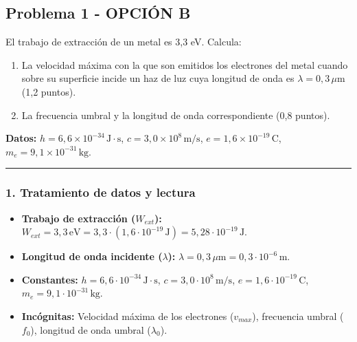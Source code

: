 \newpage

\subsection{Problema 1 - OPCIÓN B}
\label{subsec:5B_2007_jun_ord}

\begin{cajaenunciado}
El trabajo de extracción de un metal es 3,3 eV. Calcula:
\begin{enumerate}
    \item La velocidad máxima con la que son emitidos los electrones del metal cuando sobre su superficie incide un haz de luz cuya longitud de onda es $\lambda=0,3\,\mu\text{m}$ (1,2 puntos).
    \item La frecuencia umbral y la longitud de onda correspondiente (0,8 puntos).
\end{enumerate}
\textbf{Datos:} $h=6,6\times10^{-34}\,\text{J}\cdot\text{s}$, $c=3,0\times10^8\,\text{m/s}$, $e=1,6\times10^{-19}\,\text{C}$, $m_e=9,1\times10^{-31}\,\text{kg}$.
\end{cajaenunciado}
\hrule

\subsubsection*{1. Tratamiento de datos y lectura}
\begin{itemize}
    \item \textbf{Trabajo de extracción ($W_{ext}$):} $W_{ext} = 3,3\,\text{eV} = 3,3 \cdot (1,6\cdot10^{-19}\,\text{J}) = 5,28\cdot10^{-19}\,\text{J}$.
    \item \textbf{Longitud de onda incidente ($\lambda$):} $\lambda = 0,3\,\mu\text{m} = 0,3 \cdot 10^{-6}\,\text{m}$.
    \item \textbf{Constantes:} $h=6,6\cdot10^{-34}\,\text{J}\cdot\text{s}$, $c=3,0\cdot10^8\,\text{m/s}$, $e=1,6\cdot10^{-19}\,\text{C}$, $m_e=9,1\cdot10^{-31}\,\text{kg}$.
    \item \textbf{Incógnitas:} Velocidad máxima de los electrones ($v_{max}$), frecuencia umbral ($f_0$), longitud de onda umbral ($\lambda_0$).
\end{itemize}

